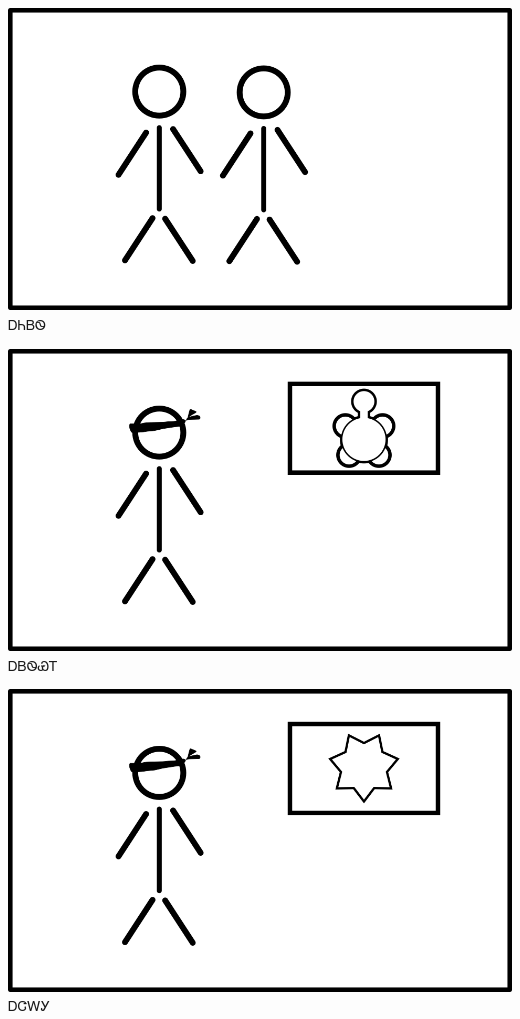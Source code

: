 \documentclass[avery5371]{flashcards}%
\begin{document}
\begin{flashcard}{
\includegraphics[width=0.95\columnwidth,height=.51\columnwidth,keepaspectratio]{../artwork/flags/aniyvwi-no-flag}
}\Huge ᎠᏂᏴᏫ
\end{flashcard}


\begin{flashcard}{
\includegraphics[width=0.95\columnwidth,height=.51\columnwidth,keepaspectratio]{../artwork/flags/adaksi-flag-blind}
}\Huge ᎠᏴᏫᏯᎢ
\end{flashcard}

\begin{flashcard}{
\includegraphics[width=0.95\columnwidth,height=.51\columnwidth,keepaspectratio]{../artwork/flags/ajalagi-flag-blind}
}\Huge ᎠᏣᎳᎩ
\end{flashcard}
\end{document}
